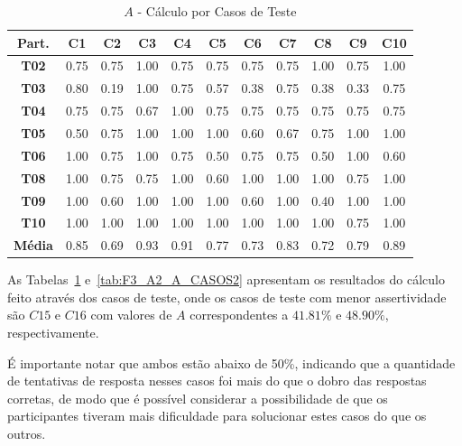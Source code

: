 \begin{table}[htbp]
	\centering
	\caption{$A$ - Cálculo por Casos de Teste}
	\begin{tabular}{|c|c|c|c|c|c|c|c|c|c|c|}
		\hline
		\rowcolor[HTML]{D9D9D9} 
		\cellcolor[HTML]{D0CECE}\textbf{Part.} & \textbf{C1} & \textbf{C2} & \textbf{C3} & \textbf{C4} & \textbf{C5} & \textbf{C6} & \textbf{C7} & \textbf{C8} & \textbf{C9} & \textbf{C10} \\ \hline
		\textbf{T02} & 0.75 & 0.75 & 1.00 & 0.75 & 0.75 & 0.75 & 0.75 & 1.00 & 0.75 & 1.00 \\ \hline
		\rowcolor[HTML]{F2F2F2} 
		\textbf{T03} & 0.80 & 0.19 & 1.00 & 0.75 & 0.57 & 0.38 & 0.75 & 0.38 & 0.33 & 0.75 \\ \hline
		\textbf{T04} & 0.75 & 0.75 & 0.67 & 1.00 & 0.75 & 0.75 & 0.75 & 0.75 & 0.75 & 0.75 \\ \hline
		\rowcolor[HTML]{F2F2F2} 
		\textbf{T05} & 0.50 & 0.75 & 1.00 & 1.00 & 1.00 & 0.60 & 0.67 & 0.75 & 1.00 & 1.00 \\ \hline
		\textbf{T06} & 1.00 & 0.75 & 1.00 & 0.75 & 0.50 & 0.75 & 0.75 & 0.50 & 1.00 & 0.60 \\ \hline
		\rowcolor[HTML]{F2F2F2} 
		\textbf{T08} & 1.00 & 0.75 & 0.75 & 1.00 & 0.60 & 1.00 & 1.00 & 1.00 & 0.75 & 1.00 \\ \hline
		\textbf{T09} & 1.00 & 0.60 & 1.00 & 1.00 & 1.00 & 0.60 & 1.00 & 0.40 & 1.00 & 1.00 \\ \hline
		\rowcolor[HTML]{F2F2F2} 
		\textbf{T10} & 1.00 & 1.00 & 1.00 & 1.00 & 1.00 & 1.00 & 1.00 & 1.00 & 0.75 & 1.00 \\ \hline
		\textbf{Média} & 0.85 & 0.69 & 0.93 & 0.91 & 0.77 & 0.73 & 0.83 & 0.72 & 0.79 & 0.89 \\ \hline
	\end{tabular}
	\label{tab:F3_A2_A_CASOS}
\end{table}

As Tabelas~\ref{tab:F3_A2_A_CASOS} e~\ref{tab:F3_A2_A_CASOS2} apresentam os resultados do cálculo feito através dos casos de teste, onde os casos de teste com menor assertividade são $C15$ e $C16$ com valores de $A$ correspondentes a $41.81\%$ e $48.90\%$, respectivamente. 

É importante notar que ambos estão abaixo de 50\%, indicando que a quantidade de tentativas de resposta nesses casos foi mais do que o dobro das respostas corretas, de modo que é possível considerar a possibilidade de que os participantes tiveram mais dificuldade para solucionar estes casos do que os outros.

